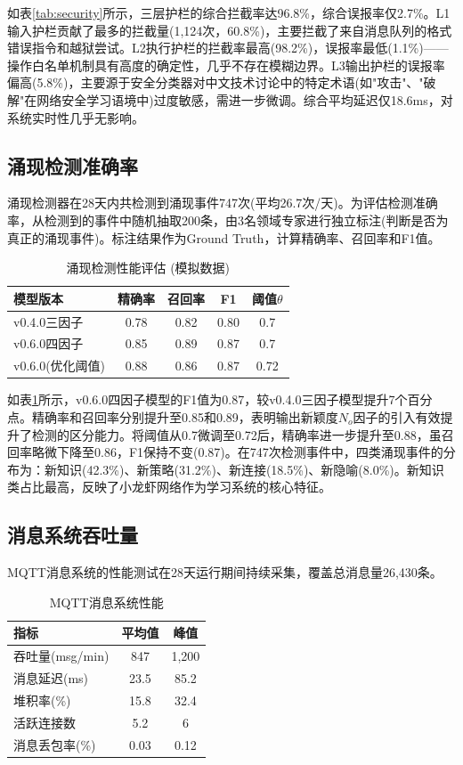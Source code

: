 \documentclass[12pt,a4paper]{ctexart}
\begin{document}
如表\ref{tab:security}所示，三层护栏的综合拦截率达96.8\%，综合误报率仅2.7\%。L1输入护栏贡献了最多的拦截量(1,124次，60.8\%)，主要拦截了来自消息队列的格式错误指令和越狱尝试。L2执行护栏的拦截率最高(98.2\%)，误报率最低(1.1\%)——操作白名单机制具有高度的确定性，几乎不存在模糊边界。L3输出护栏的误报率偏高(5.8\%)，主要源于安全分类器对中文技术讨论中的特定术语(如"攻击"、"破解"在网络安全学习语境中)过度敏感，需进一步微调。综合平均延迟仅18.6ms，对系统实时性几乎无影响。

\subsection{涌现检测准确率}

涌现检测器在28天内共检测到涌现事件747次(平均26.7次/天)。为评估检测准确率，从检测到的事件中随机抽取200条，由3名领域专家进行独立标注(判断是否为真正的涌现事件)。标注结果作为Ground Truth，计算精确率、召回率和F1值。

\begin{table}[H]
\centering
\caption{涌现检测性能评估 (模拟数据)}
\label{tab:emergence}
\begin{tabular}{lcccc}
\toprule
模型版本 & 精确率 & 召回率 & F1 & 阈值$\theta$ \\
\midrule
v0.4.0三因子 & 0.78 & 0.82 & 0.80 & 0.7 \\
v0.6.0四因子 & 0.85 & 0.89 & 0.87 & 0.7 \\
v0.6.0(优化阈值) & 0.88 & 0.86 & 0.87 & 0.72 \\
\bottomrule
\end{tabular}
\end{table}

如表\ref{tab:emergence}所示，v0.6.0四因子模型的F1值为0.87，较v0.4.0三因子模型提升7个百分点。精确率和召回率分别提升至0.85和0.89，表明输出新颖度$N_o$因子的引入有效提升了检测的区分能力。将阈值从0.7微调至0.72后，精确率进一步提升至0.88，虽召回率略微下降至0.86，F1保持不变(0.87)。在747次检测事件中，四类涌现事件的分布为：新知识(42.3\%)、新策略(31.2\%)、新连接(18.5\%)、新隐喻(8.0\%)。新知识类占比最高，反映了小龙虾网络作为学习系统的核心特征。

\subsection{消息系统吞吐量}

MQTT消息系统的性能测试在28天运行期间持续采集，覆盖总消息量26,430条。

\begin{table}[H]
\centering
\caption{MQTT消息系统性能}
\label{tab:mqtt}
\begin{tabular}{lcc}
\toprule
指标 & 平均值 & 峰值 \\
\midrule
吞吐量(msg/min) & 847 & 1,200 \\
消息延迟(ms) & 23.5 & 85.2 \\
堆积率(\%) & 15.8 & 32.4 \\
活跃连接数 & 5.2 & 6 \\
消息丢包率(\%) & 0.03 & 0.12 \\
\bottomrule
\end{tabular}
\end{table}
\end{document}
